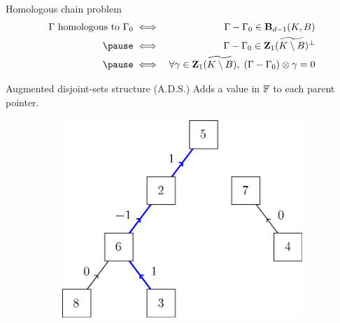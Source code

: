 \begin{frame}{Homologous chain problem}
	\begin{eqnarray*}
		\Gamma \textrm{ homologous to } \Gamma_0 &\iff& \Gamma - \Gamma_0 \in \Bchains_{d-1}(K, B) \\
		\pause &\iff& \Gamma - \Gamma_0 \in \Zchains_1(\widetilde{K \setminus B})^{\perp} \\
		\pause &\iff& \forall \gamma \in \Zchains_1(\widetilde{K \setminus B}), \; (\Gamma - \Gamma_0) \otimes \gamma = 0
	\end{eqnarray*}
\end{frame}

\begin{frame}{Augmented disjoint-sets structure (A.D.S.)}
	Adds a value in $\mathbb{F}$ to each parent pointer.
	\begin{figure}
		\centering
		\begin{subfigure}{0.45\textwidth}
			\includegraphics[width=\linewidth]{ds/augmented_disjoint_find}
		\end{subfigure}%
		\hspace{0.045\textwidth}%
		\vline%
		\hspace{0.045\textwidth}%
		\begin{subfigure}{0.45\textwidth}

\end{subfigure}
\end{figure}
\end{frame}
